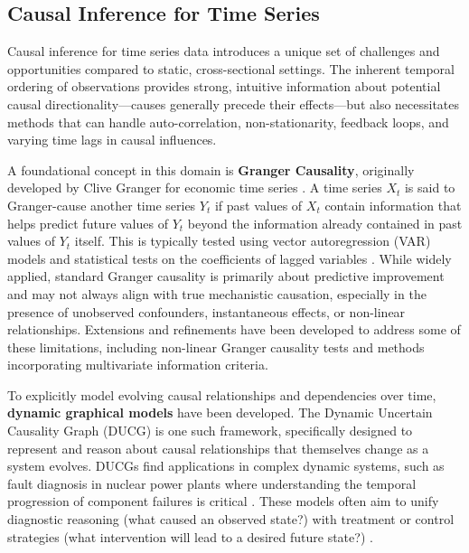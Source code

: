 \subsection{Causal Inference for Time Series}
\label{subsec:causal_timeseries}

Causal inference for time series data introduces a unique set of challenges and opportunities compared to static, cross-sectional settings. The inherent temporal ordering of observations provides strong, intuitive information about potential causal directionality---causes generally precede their effects---but also necessitates methods that can handle auto-correlation, non-stationarity, feedback loops, and varying time lags in causal influences.

A foundational concept in this domain is \textbf{Granger Causality}, originally developed by Clive Granger for economic time series \cite{Granger1969Investigating, granger1980testing}. A time series $X_t$ is said to Granger-cause another time series $Y_t$ if past values of $X_t$ contain information that helps predict future values of $Y_t$ beyond the information already contained in past values of $Y_t$ itself. This is typically tested using vector autoregression (VAR) models and statistical tests on the coefficients of lagged variables \cite{geweke1982measurement, padav2021granger}. While widely applied, standard Granger causality is primarily about predictive improvement and may not always align with true mechanistic causation, especially in the presence of unobserved confounders, instantaneous effects, or non-linear relationships. Extensions and refinements have been developed to address some of these limitations, including non-linear Granger causality tests and methods incorporating multivariate information criteria.

To explicitly model evolving causal relationships and dependencies over time, \textbf{dynamic graphical models} have been developed. The Dynamic Uncertain Causality Graph (DUCG) \cite{Zhang2012Dynamic} is one such framework, specifically designed to represent and reason about causal relationships that themselves change as a system evolves. DUCGs find applications in complex dynamic systems, such as fault diagnosis in nuclear power plants where understanding the temporal progression of component failures is critical \cite{Deng2018Cubic, Hu2017Accident}. These models often aim to unify diagnostic reasoning (what caused an observed state?) with treatment or control strategies (what intervention will lead to a desired future state?) \cite{Deng2020Towards}.

